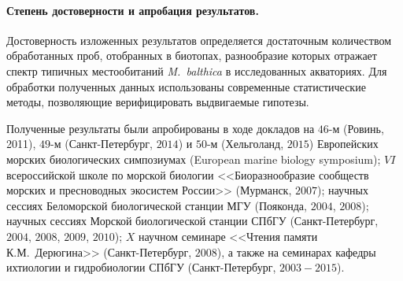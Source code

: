 \paragraph{Степень достоверности и апробация результатов.}
Достоверность изложенных результатов определяется достаточным количеством обработанных проб, отобранных в биотопах, разнообразие которых отражает спектр типичных местообитаний \textit{M.~balthica} в исследованных акваториях.
Для обработки полученных данных использованы современные статистические методы, позволяющие верифицировать выдвигаемые гипотезы.

Полученные результаты были апробированы в ходе докладов на 
$46$-м (Ровинь, 2011), $49$-м (Санкт-Петербург, $2014$) и $50$-м (Хельголанд, $2015$) Европейских морских биологических симпозиумах (European marine biology symposium); 
$VI$ всероссийской школе по морской биологии <<Биоразнообразие сообществ морских и пресноводных экосистем России>> (Мурманск, $2007$); 
научных сессиях Беломорской биологической станции МГУ (Пояконда, $2004$, $2008$); 
научных сессиях Морской биологической станции СПбГУ (Санкт-Петербург, $2004$, $2008$, $2009$, $2010$); 
$X$ научном семинаре <<Чтения памяти К.М.~Дерюгина>> (Санкт-Петербург, $2008$),
а также на семинарах кафедры  ихтиологии и гидробиологии СПбГУ (Санкт-Петербург, $2003 - 2015$).

